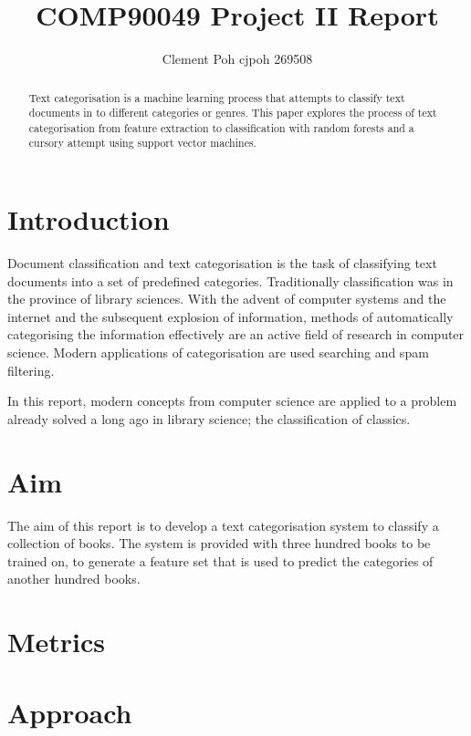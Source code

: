 \documentclass[11pt]{article}
\title{COMP90049 Project II Report}
\author{Clement Poh cjpoh 269508}
\begin{document}
\maketitle


\begin{abstract}

Text categorisation is a machine learning process that attempts to classify text
documents in to different categories or genres. This paper explores the process
of text categorisation from feature extraction to classification with random
forests and a cursory attempt using support vector machines.

\end{abstract}


\section{Introduction}

Document classification and text categorisation is the task of classifying text
documents into a set of predefined categories. Traditionally classification was
in the province of library sciences. With the advent of computer systems and the
internet and the subsequent explosion of information, methods of automatically
categorising the information effectively are an active field of research in
computer science. Modern applications of categorisation are used searching and
spam filtering.

In this report, modern concepts from computer science are applied to a problem
already solved a long ago in library science; the classification of classics.

\section{Aim}

The aim of this report is to develop a text categorisation system to classify a
collection of books. The system is provided with three hundred books to be
trained on, to generate a feature set that is used to predict the categories of
another hundred books.

\section{Metrics}


\section{Approach}
\end{document}

